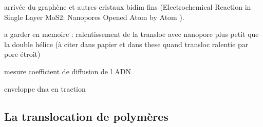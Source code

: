arrivée du graphène et autres cristaux bidim fins (Electrochemical Reaction in Single Layer MoS2: Nanopores Opened Atom by Atom \cite{Feng2015}).








a garder en memoire : ralentissement de la transloc avec nanopore plus petit que la double hélice (à citer dans papier et dans these quand transloc ralentie par pore étroit)\cite{Mirsaidov2010}

mesure coefficient de diffusion de l ADN \cite{Smith1996}

enveloppe dna en traction \cite{Wirtz1995}



\subsection{La translocation de polymères}



